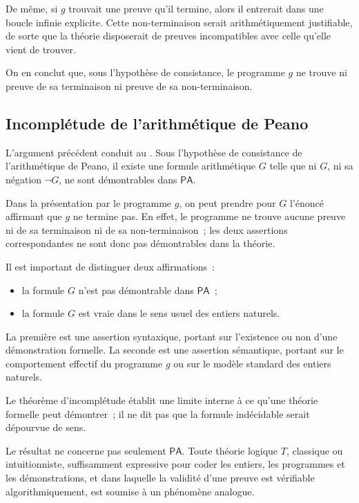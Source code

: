 \thingy
De même, si $g$ trouvait une preuve qu'il termine, alors il entrerait
dans une boucle infinie explicite.  Cette non-terminaison serait
arithmétiquement justifiable, de sorte que la théorie disposerait de
preuves incompatibles avec celle qu'elle vient de trouver.

On en conclut que, sous l'hypothèse de consistance, le programme $g$ ne
trouve ni preuve de sa terminaison ni preuve de sa non-terminaison.


\subsection{Incomplétude de l'arithmétique de Peano}

\thingy
L'argument précédent conduit au .
Sous l'hypothèse de consistance de l'arithmétique de Peano, il existe une
formule arithmétique $G$ telle que ni $G$, ni sa négation $\neg G$, ne
sont démontrables dans $\mathsf{PA}$.

Dans la présentation par le programme $g$, on peut prendre pour $G$
l'énoncé affirmant que $g$ ne termine pas.  En effet, le programme ne
trouve aucune preuve ni de sa terminaison ni de sa non-terminaison ; les
deux assertions correspondantes ne sont donc pas démontrables dans la
théorie.

\thingy
Il est important de distinguer deux affirmations :
\begin{itemize}
\item la formule $G$ n'est pas démontrable dans $\mathsf{PA}$ ;
\item la formule $G$ est vraie dans le sens usuel des entiers naturels.
\end{itemize}
La première est une assertion syntaxique, portant sur l'existence ou non
d'une démonstration formelle.  La seconde est une assertion sémantique,
portant sur le comportement effectif du programme $g$ ou sur le modèle
standard des entiers naturels.

Le théorème d'incomplétude établit une limite interne à ce qu'une théorie
formelle peut démontrer ; il ne dit pas que la formule indécidable serait
dépourvue de sens.

\thingy
Le résultat ne concerne pas seulement $\mathsf{PA}$.  Toute théorie
logique $T$, classique ou intuitionniste, suffisamment expressive pour
coder les entiers, les programmes et les démonstrations, et dans laquelle
la validité d'une preuve est vérifiable algorithmiquement, est soumise à
un phénomène analogue.

